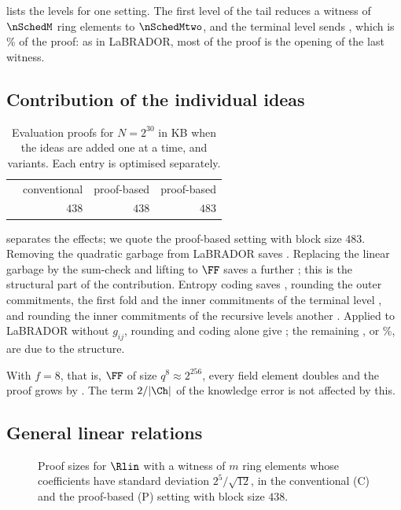  lists the levels for one setting. The first level of the tail reduces a witness of $\nSchedM$ ring elements to $\nSchedMtwo$, and the terminal level sends \nSchedLastKB\KB, which is \nSchedLastPct\% of the proof: as in LaBRADOR, most of the proof is the opening of the last witness.

\subsection{Contribution of the individual ideas}\label{sec:ablation}

\begin{table}[t]
\centering\small
\setlength{\tabcolsep}{5pt}
\begin{tabular}{@{}lrrr@{}}
\toprule
 & conventional & proof-based & proof-based\\
 & $438$ & $438$ & $483$\\
\midrule

\bottomrule
\end{tabular}
\caption{Evaluation proofs for $N=2^{30}$ in KB when the ideas are added one at a time, and variants. Each entry is optimised separately.}
\label{tab:ablation}
\end{table}

 separates the effects; we quote the proof-based setting with block size $483$. Removing the quadratic garbage from LaBRADOR saves \nAblG\KB. Replacing the linear garbage by the sum-check and lifting to $\FF$ saves a further \nAblS\KB; this is the structural part of the contribution. Entropy coding saves \nAblE\KB, rounding the outer commitments, the first fold and the inner commitments of the terminal level \nAblR\KB, and rounding the inner commitments of the recursive levels another \nAblI\KB. Applied to LaBRADOR without $g_{ij}$, rounding and coding alone give \nSQc\KB; the remaining \nAblStrong\KB, or \nPctStrongQ\%, are due to the structure.

With $f=8$, that is, $\FF$ of size $q^8\approx2^{256}$, every field element doubles and the proof grows by \nAblFeight\KB. The term $2/\lvert\Ch\rvert$ of the knowledge error is not affected by this.

\subsection{General linear relations}\label{sec:linear}

\begin{figure}[t]
\centering

\caption{Proof sizes for $\Rlin$ with a witness of $m$ ring elements whose coefficients have standard deviation $2^5/\sqrt{12}$, in the conventional (C) and the proof-based (P) setting with block size $438$.}
\label{fig:lin}
\end{figure}

